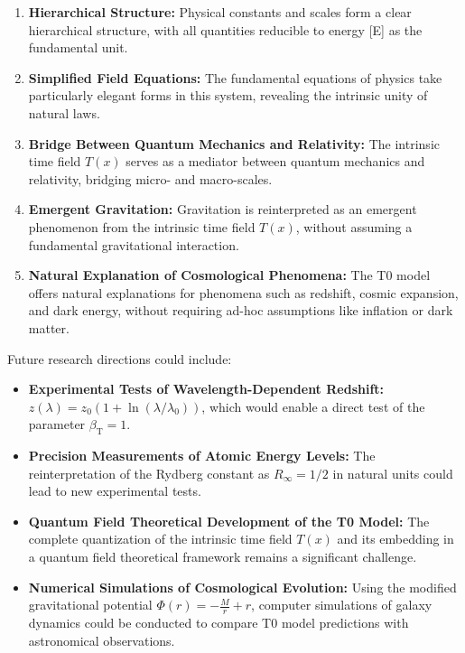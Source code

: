 \documentclass[12pt,a4paper]{article}
\newcommand{\Tfield}{T(x)}
\newcommand{\betaT}{\beta_{\text{T}}}
\begin{document}
	\begin{enumerate}
		\item \textbf{Hierarchical Structure:} Physical constants and scales form a clear hierarchical structure, with all quantities reducible to energy [E] as the fundamental unit.
		
		\item \textbf{Simplified Field Equations:} The fundamental equations of physics take particularly elegant forms in this system, revealing the intrinsic unity of natural laws.
		
		\item \textbf{Bridge Between Quantum Mechanics and Relativity:} The intrinsic time field $\Tfield$ serves as a mediator between quantum mechanics and relativity, bridging micro- and macro-scales.
		
		\item \textbf{Emergent Gravitation:} Gravitation is reinterpreted as an emergent phenomenon from the intrinsic time field $\Tfield$, without assuming a fundamental gravitational interaction.
		
		\item \textbf{Natural Explanation of Cosmological Phenomena:} The T0 model offers natural explanations for phenomena such as redshift, cosmic expansion, and dark energy, without requiring ad-hoc assumptions like inflation or dark matter.
	\end{enumerate}
	
	Future research directions could include:
	
	\begin{itemize}
		\item \textbf{Experimental Tests of Wavelength-Dependent Redshift:} $z(\lambda) = z_0(1+\ln(\lambda/\lambda_0))$, which would enable a direct test of the parameter $\betaT = 1$.
		
		\item \textbf{Precision Measurements of Atomic Energy Levels:} The reinterpretation of the Rydberg constant as $R_\infty = 1/2$ in natural units could lead to new experimental tests.
		
		\item \textbf{Quantum Field Theoretical Development of the T0 Model:} The complete quantization of the intrinsic time field $\Tfield$ and its embedding in a quantum field theoretical framework remains a significant challenge.
		
		\item \textbf{Numerical Simulations of Cosmological Evolution:} Using the modified gravitational potential $\Phi(r) = -\frac{M}{r} + r$, computer simulations of galaxy dynamics could be conducted to compare T0 model predictions with astronomical observations.
	\end{itemize}
	
\end{document}
